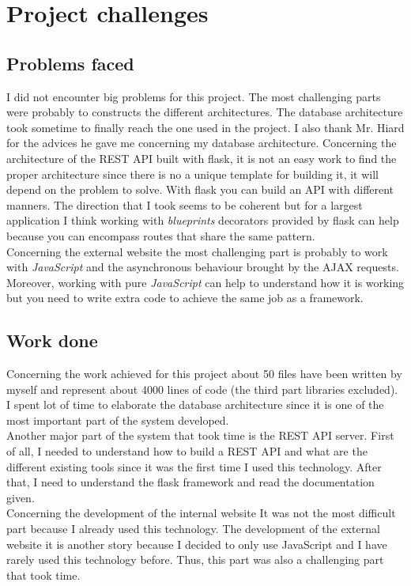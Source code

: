 \section{Project challenges}
\subsection{Problems faced}
I did not encounter big problems for this project. The most challenging parts were probably to constructs the different architectures. The database architecture took sometime to finally reach the one used in the project. I also thank Mr. Hiard for the advices he gave me concerning my database architecture. Concerning the architecture of the REST API built with flask, it is not an easy work to find the proper architecture since there is no a unique template for building it, it will depend on the problem to solve. With flask you can build an API with different manners. The direction that I took seems to be coherent but for a largest application I think working with \textit{blueprints} decorators provided by flask can help because you can encompass routes that share the same pattern.\\

Concerning the external website the most challenging part is probably to work with \textit{JavaScript} and the asynchronous behaviour brought by the AJAX requests. Moreover, working with pure \textit{JavaScript} can help to understand how it is working but you need to write extra code to achieve the same job as a framework.

\subsection{Work done}
Concerning the work achieved for this project about 50 files have been written by myself and represent about 4000 lines of code (the third part libraries excluded). I spent lot of time to elaborate the database architecture since it is one of the most important part of the system developed.\\

Another major part of the system that took time is the REST API server. First of all, I needed to understand how to build a REST API and what are the different existing tools since it was the first time I used this technology. After that, I need to understand the flask framework and read the documentation given.\\

Concerning the development of the internal website It was not the most difficult part because I already used this technology. The development of the external website it is another story because I decided to only use JavaScript and I have rarely used this technology before. Thus, this part was also a challenging part that took time.\\

